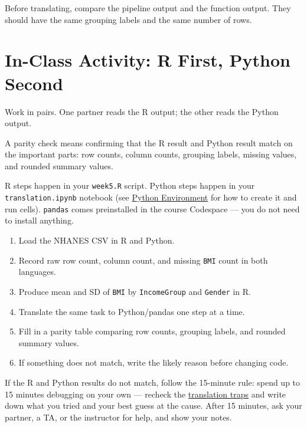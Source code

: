 \documentclass[
  letterpaper,
  DIV=11,
  numbers=noendperiod,
  oneside]{scrreprt}
\providecommand{\tightlist}{%
  \setlength{\itemsep}{0pt}\setlength{\parskip}{0pt}}
\begin{document}
Before translating, compare the pipeline output and the function output.
They should have the same grouping labels and the same number of rows.

\section*{In-Class Activity: R First, Python
Second}\label{in-class-activity-r-first-python-second}


Work in pairs. One partner reads the R output; the other reads the
Python output.

A parity check means confirming that the R result and Python result
match on the important parts: row counts, column counts, grouping
labels, missing values, and rounded summary values.

R steps happen in your \texttt{week5.R} script. Python steps happen in
your \texttt{translation.ipynb} notebook (see
\href{python02-environment.qmd}{Python Environment} for how to create it
and run cells). \texttt{pandas} comes preinstalled in the course
Codespace --- you do not need to install anything.

\begin{enumerate}
\def\labelenumi{\arabic{enumi}.}
\tightlist
\item
  Load the NHANES CSV in R and Python.
\item
  Record raw row count, column count, and missing \texttt{BMI} count in
  both languages.
\item
  Produce mean and SD of \texttt{BMI} by \texttt{IncomeGroup} and
  \texttt{Gender} in R.
\item
  Translate the same task to Python/pandas one step at a time.
\item
  Fill in a parity table comparing row counts, grouping labels, and
  rounded summary values.
\item
  If something does not match, write the likely reason before changing
  code.
\end{enumerate}

If the R and Python results do not match, follow the 15-minute rule:
spend up to 15 minutes debugging on your own --- recheck the
\href{python04-translation-traps.qmd}{translation traps} and write down
what you tried and your best guess at the cause. After 15 minutes, ask
your partner, a TA, or the instructor for help, and show your notes.
\end{document}
